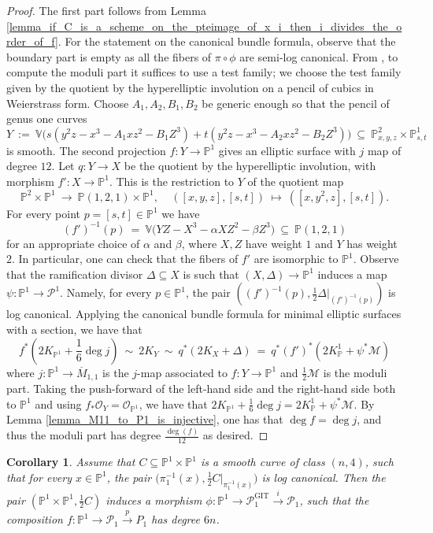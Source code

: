 \documentclass[a4paper,12pt]{amsart}
\DeclareMathOperator{\GIT}{GIT}
\newcommand{\bV}{{\mathbb V}}
\newcommand{\bP}{{\mathbb P}}
\newcommand{\sP}{{\mathscr{P}}}
\newcommand{\cO}{{\mathcal{O}}}
\newcommand\cM{{\mathcal{M}}}
\newtheorem{corollary}[theorem]{Corollary}
\theoremstyle{definition}
\theoremstyle{remark}
\begin{document}
\begin{proof}
    The first part follows from Lemma \ref{lemma_if_C_is_a_scheme_on_the_pteimage_of_x_i_then_i_divides_the_order_of_f}.
For the statement on the canonical bundle formula, observe that the boundary part is empty as all the fibers of $\pi\circ \phi$ are semi-log canonical. From , to compute the moduli part it suffices to use a test family; we choose the test family given by the quotient by the hyperelliptic involution on a pencil of cubics in Weierstrass form. Choose $A_1, A_2, B_1, B_2$ be generic enough so that the pencil of genus one curves
\[
Y\ :=\ \bV\big( s(y^2z-x^3-A_1xz^2-B_1Z^3) + t(y^2z-x^3-A_2xz^2-B_2Z^3)\big)\ \subseteq\  \bP^2_{x,y,z}\times \bP^1_{s,t}
\]
is smooth. The second projection
$f\colon Y\to \bP^1$ gives an elliptic surface with $j$ map of degree $12$. Let $q\colon Y\to X$ be the quotient by the hyperelliptic involution,
with morphism $f'\colon X\to \bP^1$. This is the restriction to $Y$ of the quotient map $$\bP^2\times \bP^1\ \longrightarrow\  \bP(1,2,1)\times \bP^1,\ \ \ \ \ ([x,y,z],[s,t])\ \mapsto\  ([x,y^2,z],[s,t]).$$ For every point $p=[s,t]\in \bP^1$ we have \[(f')^{-1}(p) \ =\ \bV\big(YZ-X^3-\alpha XZ^2 -\beta Z^3\big)\ \subseteq\  \bP(1,2,1)\]for an appropriate choice of $\alpha$ and $\beta$, where $X,Z$ have weight $1$ and $Y$ has weight $2$.
In particular, one can check that the fibers of $f'$ are isomorphic to $\bP^1$. Observe that the ramification divisor $\Delta\subseteq X$ is such that $(X,\Delta)\to \bP^1$ induces a map $\psi:\bP^1\to \sP^1$. Namely, for every $p\in \bP^1$, the pair $((f')^{-1}(p),\frac{1}{2}\Delta|_{(f')^{-1}(p)})$ is log canonical. Applying the canonical bundle formula for minimal elliptic surfaces with a section, we have that \[\textstyle f^*(2K_{\bP^1}+\frac{1}{6}\deg j)\ \sim \ 2K_Y\ \sim \  q^*(2K_X+\Delta)\  =\  q^*(f')^*(2K_\bP^1 + \psi^*\cM)\] where $j\colon\bP^1\to \overline{M}_{1,1}$ is the $j$-map associated to $f:Y\rightarrow \bP^1$ and $\frac{1}{2}\cM$ is the moduli part. Taking the push-forward of the left-hand side and the right-hand side both to $\bP^1$ and using $f_*\cO_Y=\cO_{\bP^1}$, we have that $2K_{\bP^1}+\frac{1}{6}\deg j = 2K_\bP^1 + \psi^*\cM$. By Lemma \ref{lemma_M11_to_P1_is_injective}, one has that $\deg f=\deg j$, and thus the moduli part has degree $\frac{\deg(f)}{12}$ as desired.
\end{proof}

\begin{corollary}\label{cor:degree 6n}
    Assume that $C\subseteq \bP^1\times \bP^1$ is a smooth curve of class $(n,4)$, such that for every $x\in \bP^1$, the pair $\big(\pi^{-1}_1(x),\frac{1}{2}C|_{\pi^{-1}_1(x)}\big)$ is log canonical. Then the pair $(\bP^1\times \bP^1,\frac{1}{2}C)$ induces a morphism $\phi:\bP^1\to \sP_1^{\GIT}\xrightarrow{i} \sP_1$, such that the composition $f:\bP^1\to \sP_1\xrightarrow{p} P_1$ has degree $6n$.
\end{corollary}
\end{document}

